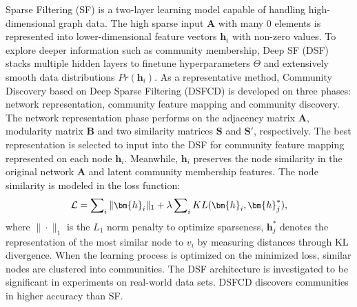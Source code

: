 \label{sec-model-filtering} 
Sparse Filtering (SF) is a two-layer learning model capable of handling high-dimensional graph data. The high sparse input $\bm{A}$ with many $0$ elements is represented into lower-dimensional feature vectors $\bm{h}_i$ with non-zero values. To explore deeper information such as community membership, Deep SF (DSF) stacks multiple hidden layers to finetune hyperparameters $\Theta$ and extensively smooth data distributions $Pr(\bm{h}_i)$.
As a representative method, Community Discovery based on Deep Sparse Filtering (DSFCD)  is developed on three phases: network representation, community feature mapping and community discovery. The network representation phase performs on the adjacency matrix $\bm{A}$, modularity matrix $\bm{B}$ and two similarity matrices $\bm{S}$ and $\bm{S}'$, respectively. The best representation is selected to input into the DSF for community feature mapping represented on each node $\bm{h}_i$. Meanwhile, $\bm{h}_i$ preserves the node similarity in the original network $\bm{A}$ and latent community membership features. The node similarity is modeled in the loss function:
\begin{equation} 
\small
\mathcal{L} = \sum\nolimits_i \| \bm{h}_{i}\|_1 + \lambda \sum\nolimits_i KL(\bm{h}_i, \bm{h}^*_j),
\end{equation}
where $\|\cdot\|_1$ is the $L_1$ norm penalty to optimize sparseness, $\bm{h}^*_j$ denotes the representation of the most similar node to $v_{i}$ by measuring distances through KL divergence. When the learning process is optimized on the minimized loss, similar nodes are clustered into communities. The DSF architecture is investigated to be significant in experiments on real-world data sets. DSFCD discovers communities in higher accuracy than SF.
